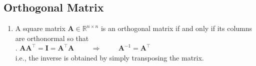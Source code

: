 \subsection{Orthogonal Matrix}


\begin{enumerate}
    \item A square matrix $\bm{A} \in \mathbb{R}^{n\times n}$ is an orthogonal matrix if and only if its columns are orthonormal so that
    \hfill \cite{mfml/book/mml/Deisenroth-Faisal-Ong}
    \\
    .\hfill
    $
        \bm{AA}^\top = \bm{I} = \bm{A}^\top \bm{A}
        \hspace{1cm}
        \Rightarrow
        \hspace{1cm}
        \bm{A}^{-1} = \bm{A}^\top
    $
    \hfill \cite{mfml/book/mml/Deisenroth-Faisal-Ong}
    \\
    i.e., the inverse is obtained by simply transposing the matrix.
    \hfill \cite{mfml/book/mml/Deisenroth-Faisal-Ong}
\end{enumerate}








